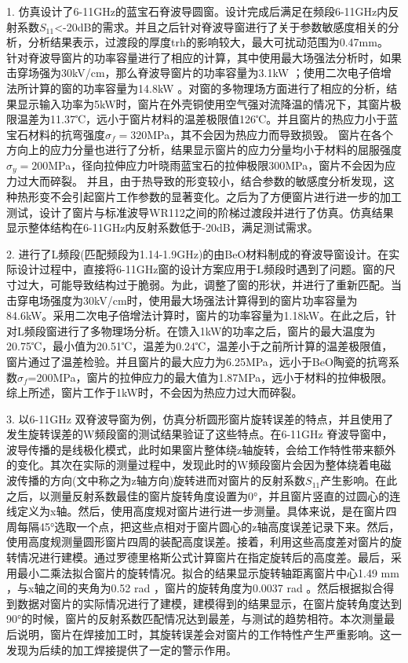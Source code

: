 \documentclass[master]{thesis-uestc}
\begin{document}
1. 仿真设计了6-11GHz的蓝宝石脊波导圆窗。设计完成后满足在频段6-11GHz内反射系数\(S_{11}\)<-20dB的需求。并且之后针对脊波导窗进行了关于参数敏感度相关的分析，分析结果表示，过渡段的厚度trh的影响较大，最大可扰动范围为0.47mm。
针对脊波导窗片的功率容量进行了相应的计算，其中使用最大场强法分析时，如果击穿场强为30kV/cm，那么脊波导窗片的功率容量为3.1kW ；使用二次电子倍增法所计算的窗的功率容量为14.8kW 。对窗的多物理场方面进行了相应的分析，结果显示输入功率为5kW时，窗片在外壳铜使用空气强对流降温的情况下，其窗片极限温差为11.37℃，远小于窗片材料的温差极限值126℃。并且窗片的热应力小于蓝宝石材料的抗弯强度\(\sigma_f = 320\)MPa，其不会因为热应力而导致损毁。
窗片在各个方向上的应力分量也进行了分析，结果显示窗片的应力分量均小于材料的屈服强度\(\sigma_y = 200\)MPa，径向拉伸应力叶晓雨蓝宝石的拉伸极限300MPa，窗片不会因为应力过大而碎裂。
并且，由于热导致的形变较小，结合参数的敏感度分析发现，这种热形变不会引起窗片工作参数的显著变化。之后为了方便窗片进行进一步的加工测试，设计了窗片与标准波导WR112之间的阶梯过渡段并进行了仿真。仿真结果显示整体结构在6-11GHz内反射系数低于-20dB，满足测试需求。

2. 进行了L频段(匹配频段为1.14-1.9GHz)的由BeO材料制成的脊波导窗设计。在实际设计过程中，直接将6-11GHz窗的设计方案应用于L频段时遇到了问题。窗的尺寸过大，可能导致结构过于脆弱。为此，调整了窗的形状，并进行了重新匹配。当击穿电场强度为30kV/cm时，使用最大场强法计算得到的窗片功率容量为84.6kW。采用二次电子倍增法计算时，窗片的功率容量为1.18kW。在此之后，针对L频段窗进行了多物理场分析。在馈入1kW的功率之后，窗片的最大温度为20.75℃，最小值为20.51℃，温差为0.24℃，温差小于之前所计算的温差极限值，窗片通过了温差检验。并且窗片的最大应力为6.25MPa，远小于BeO陶瓷的抗弯系数\(\sigma_f\)=200MPa，窗片的拉伸应力的最大值为1.87MPa，远小于材料的拉伸极限。综上所述，窗片工作于1kW时，不会因为热应力过大而碎裂。

3. 以6-11GHz 双脊波导窗为例，仿真分析圆形窗片旋转误差的特点，并且使用了发生旋转误差的W频段窗的测试结果验证了这些特点。在6-11GHz 脊波导窗中，波导传播的是线极化模式，此时如果窗片整体绕z轴旋转，会给工作特性带来额外的变化。其次在实际的测量过程中，发现此时的W频段窗片会因为整体绕着电磁波传播的方向(文中称之为z轴方向)旋转进而对窗片的反射系数\(S_{11}\)产生影响。在此之后，以测量反射系数最佳的窗片旋转角度设置为0°，并且窗片竖直的过圆心的连线定义为x轴。然后，使用高度规对窗片进行进一步测量。具体来说，是在窗片四周每隔45°选取一个点，把这些点相对于窗片圆心的z轴高度误差记录下来。然后，使用高度规测量圆形窗片四周的装配高度误差。接着，利用这些高度差对窗片的旋转情况进行建模。通过罗德里格斯公式计算窗片在指定旋转后的高度差。最后，采用最小二乘法拟合窗片的旋转情况。拟合的结果显示旋转轴距离窗片中心1.49 mm ，与x轴之间的夹角为0.52 rad ，窗片的旋转角度为0.0037 rad 。然后根据拟合得到数据对窗片的实际情况进行了建模，建模得到的结果显示，在窗片旋转角度达到90°的时候，窗片的反射系数匹配情况达到最差，与测试的趋势相符。本次测量最后说明，窗片在焊接加工时，其旋转误差会对窗片的工作特性产生严重影响。这一发现为后续的加工焊接提供了一定的警示作用。
\end{document}
